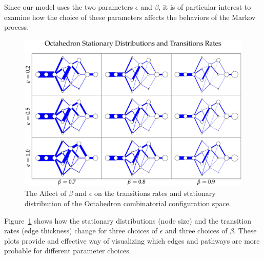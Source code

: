 Since our model uses the two parameters $\epsilon$ and $\beta$, it is of particular interest to examine how the choice of these parameters affects the behaviors of the Markov process. 
\begin{figure}[ht]
\centering
  \includegraphics[scale=0.22]{images/octahedron_pi_Q_grid.eps}
\caption{The Affect of $\beta$ and $\epsilon$ on the transitions rates and stationary distribution of the Octahedron combinatorial configuration space.}
\label{fig:OctaPiGrid}
\end{figure}
Figure~\ref{fig:OctaPiGrid} shows how the stationary distributions (node size) and the transition rates (edge thickness) change for three choices of $\epsilon$ and three choices of $\beta$. These plots provide and effective way of visualizing which edges and pathways are more probable for different parameter choices. 

